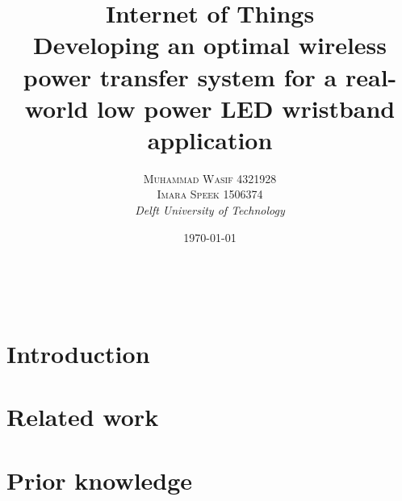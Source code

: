 \documentclass[a4paper, 10pt]{article}
\title{\textbf{Internet of Things }\\ %
Developing an optimal wireless power transfer system for a real-world low power LED wristband application} %
\author{\textsc{Muhammad Wasif 4321928\\
Imara Speek 1506374} %
\\{\textit{Delft University of Technology}}} %
\date{\today} %
\makeatletter
\renewcommand{\maketitle}{ %
\begin{flushright} %
{\LARGE\@title} %

\vspace{50pt} %

{\large\@author} %
\\\@date %


\vspace{40pt} %
\end{flushright}
}
\makeatother
\begin{document}
\maketitle %



%
%


\section{Introduction}
\label{sec:intro}




\section{Related work}
\label{sec:related}




\section{Prior knowledge}
\label{sec:prior}

\end{document}
